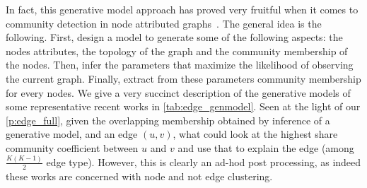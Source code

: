 In fact, this generative model approach has proved very fruitful when it comes to community
detection in node attributed graphs~\autocites{Xu2014}{Zhao2017}{Yang2013}{Kataoka2016}{Weng2016}{Newman2016}.
The general idea is the following. First, design a model to generate some of the following aspects:
the nodes attributes, the topology of the graph and the community membership of the nodes. Then,
infer the parameters that maximize the likelihood of observing the current graph. Finally, extract
from these parameters community membership for every nodes. We give a very succinct description of
the generative models of some representative recent works in \autoref{tab:edge_genmodel}. Seen at
the light of our \autoref{p:edge_full}, given the overlapping membership obtained by inference of a
generative model, and an edge $(u,v)$, what could look at the highest share community coefficient
between $u$ and $v$ and use that to explain the edge (among $\frac{K(K-1)}{2}$ edge type). However,
this is clearly an ad-hod post processing, as indeed these works are concerned with node and not
edge clustering.

